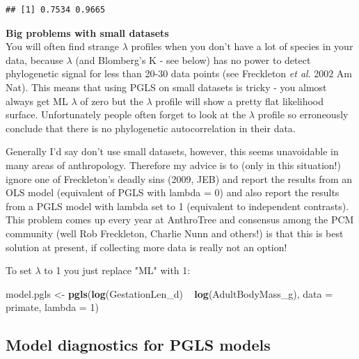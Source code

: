 \documentclass[12pt]{article}
\newcommand{\KeywordTok}[1]{\textcolor[rgb]{0.13,0.29,0.53}{\textbf{{#1}}}}
\newcommand{\DataTypeTok}[1]{\textcolor[rgb]{0.13,0.29,0.53}{{#1}}}
\newcommand{\StringTok}[1]{\textcolor[rgb]{0.31,0.60,0.02}{{#1}}}
\newcommand{\NormalTok}[1]{{#1}}
\begin{document}
\begin{verbatim}
## [1] 0.7534 0.9665
\end{verbatim}

\begin{framed}
\textbf{Big problems with small datasets}\\

You will often find strange $\lambda$ profiles when you don't have a lot of species in your data, because $\lambda$ (and Blomberg's K - see below) has no power to detect phylogenetic signal for less than 20-30 data points (see Freckleton \textit{et al}. 2002 Am Nat). This means that using PGLS on small datasets is tricky - you almost always get ML $\lambda$ of zero but the $\lambda$ profile will show a pretty flat likelihood surface. Unfortunately people often forget to look at the $\lambda$ profile so erroneously conclude that there is no phylogenetic autocorrelation in their data.

Generally I'd say don't use small datasets, however, this seems unavoidable in many areas of anthropology. Therefore my advice is to (only in this situation!) ignore one of Freckleton's deadly sins (2009, JEB) and report the results from an OLS model (equivalent of PGLS with lambda = 0) and also report the results from a PGLS model with lambda set to 1 (equivalent to independent contrasts). This problem comes up every year at AnthroTree and consensus among the PCM community (well Rob Freckleton, Charlie Nunn and others!) is that this is best solution at present, if collecting more data is really not an option!

To set $\lambda$ to 1 you just replace "ML" with 1:

\begin{snugshade}
\begin{Highlighting}[]
\NormalTok{model.pgls <-}\StringTok{ }\KeywordTok{pgls}\NormalTok{(}\KeywordTok{log}\NormalTok{(GestationLen_d) ~}\StringTok{ }\KeywordTok{log}\NormalTok{(AdultBodyMass_g), }
                   \DataTypeTok{data =} \NormalTok{primate, }\DataTypeTok{lambda =} \StringTok{1}\NormalTok{)}
\end{Highlighting}
\end{snugshade}
\end{framed}

\subsection{Model diagnostics for PGLS models}
\end{document}
